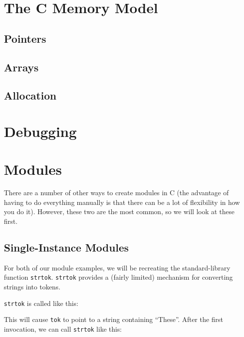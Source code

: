 \documentclass[a4paper,10pt]{article}
\newcommand{\kw}[1]{\texttt{#1}}
\begin{document}
\section{The C Memory Model}

\subsection{Pointers}

\subsection{Arrays}

\subsection{Allocation}

\section{Debugging}

\section{Modules}

There are a number of other ways to create modules in C (the advantage
of having to do everything manually is that there can be a lot of
flexibility in how you do it). However, these two are the most common,
so we will look at these first.

\subsection{Single-Instance Modules}

For both of our module examples, we will be recreating the
standard-library function \kw{strtok}. \kw{strtok} provides a (fairly
limited) mechanism for converting strings into tokens.

\kw{strtok} is called like this:


This will cause \kw{tok} to point to a string containing
``These''. After the first invocation, we can call \kw{strtok} like
this:

\end{document}
